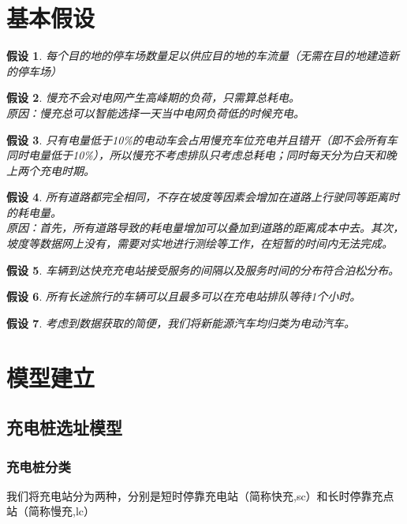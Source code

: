 \documentclass[12pt, a4paper, oneside]{ctexart}
\newtheorem{assumption}{假设}[section]
\begin{document}
\section{基本假设}
\begin{assumption}\label{asmp:lcpark}
    每个目的地的停车场数量足以供应目的地的车流量（无需在目的地建造新的停车场）
\end{assumption}
\begin{assumption}\label{asmp:lcload}
    慢充不会对电网产生高峰期的负荷，只需算总耗电。\\
    原因：慢充总可以智能选择一天当中电网负荷低的时候充电。
\end{assumption}
\begin{assumption}\label{asmp:lcoccupy}
    只有电量低于10\%的电动车会占用慢充车位充电并且错开（即不会所有车同时电量低于10\%），所以慢充不考虑排队只考虑总耗电；同时每天分为白天和晚上两个充电时期。
\end{assumption}
\begin{assumption}\label{asmp:cost}
    所有道路都完全相同，不存在坡度等因素会增加在道路上行驶同等距离时的耗电量。\\
    原因：首先，所有道路导致的耗电量增加可以叠加到道路的距离成本中去。其次，坡度等数据网上没有，需要对实地进行测绘等工作，在短暂的时间内无法完成。
\end{assumption}
\begin{assumption}
    \label{asmp:serve}
    车辆到达快充充电站接受服务的间隔以及服务时间的分布符合泊松分布。
\end{assumption}
\begin{assumption}
    所有长途旅行的车辆可以且最多可以在充电站排队等待1个小时。
\end{assumption}
\begin{assumption}
  考虑到数据获取的简便，我们将新能源汽车均归类为电动汽车。
\end{assumption}
\section{模型建立}
\subsection{充电桩选址模型}
\subsubsection{充电桩分类}
我们将充电站分为两种，分别是短时停靠充电站（简称快充,sc）和长时停靠充点站（简称慢充,lc）
\end{document}
